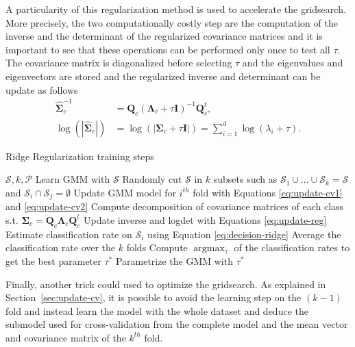 \documentclass[a4paper,11pt,DIV=16,abstracton]{scrartcl}
\begin{document}
    A particularity of this regularization method is used to accelerate the gridsearch. More precisely, the two computationally costly step are the computation of the inverse and the determinant of the regularized covariance matrices and it is important to see that these operations can be performed only once to test all $\tau$. The covariance matrix is diagonalized before selecting $\tau$ and the eigenvalues and eigenvectors are stored and the regularized inverse and determinant can be update as follows
    \begin{align}
        \hat{\boldsymbol{\Sigma}}_c^{-1} &= \mathbf{Q}_c (\boldsymbol{\Lambda}_c + \tau \mathbf{I})^{-1} \mathbf{Q}_c^t, \nonumber\\
        \log (|\hat{\boldsymbol{\Sigma}}_c|) &= \log (|\boldsymbol{\Sigma}_c + \tau \mathbf{I}|) = \sum_{i=1}^{d} \log (\lambda_i + \tau).
        \label{eq:update-reg}
    \end{align}

    \begin{algorithm}
    \caption{Ridge Regularization training steps\label{alg:ridge}}
    \begin{algorithmic}[1]
    \REQUIRE $\mathcal{S},k,\mathcal{P}$
    \STATE Learn GMM with $\mathcal{S}$
    \STATE Randomly cut $\mathcal{S}$ in $k$ subsets such as $\mathcal{S}_1 \cup \text{...} \cup \mathcal{S}_k = \mathcal{S}$ and $\mathcal{S}_i \cap \mathcal{S}_j = \emptyset$
    \STATE Update GMM model for $i^{th}$ fold with Equations \ref{eq:update-cv1} and \ref{eq:update-cv2}
    \STATE Compute decomposition of covariance matrices of each class s.t. $\boldsymbol{\Sigma}_c = \mathbf{Q}_c \boldsymbol{\Lambda}_c \mathbf{Q}_c^t$
    \STATE Update inverse and logdet with Equations \ref{eq:update-reg}
    \STATE Estimate classification rate on $\mathcal{S}_i$ using Equation \ref{eq:decision-ridge}
    \ENDFOR
    \ENDFOR
    \STATE Average the classification rate over the $k$ folds
    \STATE Compute $\text{arg} \max_{\tau}$ of the classification rates to get the best parameter $\tau^*$
    \STATE Parametrize the GMM with $\tau^*$
    \end{algorithmic}
    \end{algorithm}

    Finally, another trick could used to optimize the gridsearch. As explained in Section~\ref{sec:update-cv}, it is possible to avoid the learning step on the $(k-1)$ fold and instead learn the model with the whole dataset and deduce the submodel used for cross-validation from the complete model and the mean vector and covariance matrix of the $k^{th}$ fold.
\end{document}
